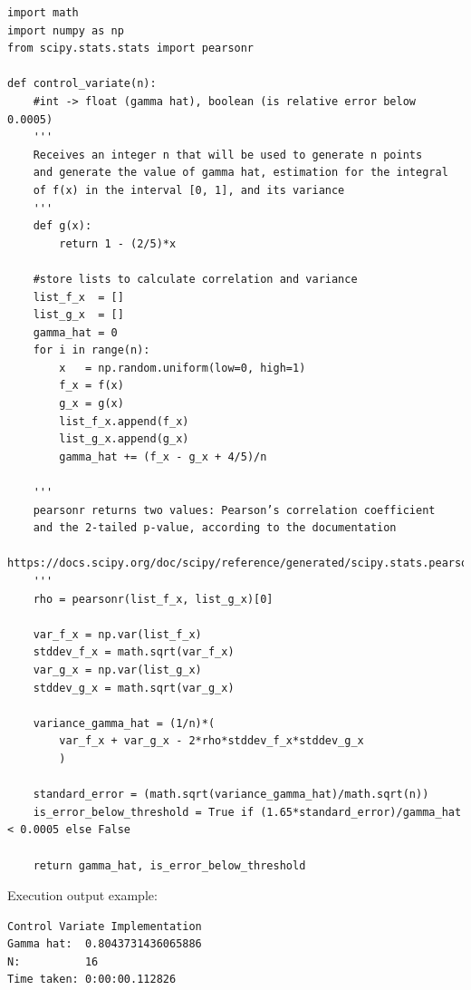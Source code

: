 \documentclass{homework}
\begin{document}
\begin{lstlisting}
import math
import numpy as np
from scipy.stats.stats import pearsonr

def control_variate(n):
	#int -> float (gamma hat), boolean (is relative error below 0.0005)
	'''
	Receives an integer n that will be used to generate n points
	and generate the value of gamma hat, estimation for the integral
	of f(x) in the interval [0, 1], and its variance
	'''
	def g(x):
		return 1 - (2/5)*x

	#store lists to calculate correlation and variance
	list_f_x  = []
	list_g_x  = []
	gamma_hat = 0
	for i in range(n):
		x   = np.random.uniform(low=0, high=1)
		f_x = f(x)
		g_x = g(x)
		list_f_x.append(f_x)
		list_g_x.append(g_x)
		gamma_hat += (f_x - g_x + 4/5)/n

	'''
	pearsonr returns two values: Pearson’s correlation coefficient
	and the 2-tailed p-value, according to the documentation
	https://docs.scipy.org/doc/scipy/reference/generated/scipy.stats.pearsonr.html
	'''
	rho = pearsonr(list_f_x, list_g_x)[0]

	var_f_x = np.var(list_f_x)
	stddev_f_x = math.sqrt(var_f_x)
	var_g_x = np.var(list_g_x)
	stddev_g_x = math.sqrt(var_g_x)

	variance_gamma_hat = (1/n)*(
		var_f_x + var_g_x - 2*rho*stddev_f_x*stddev_g_x
		)

	standard_error = (math.sqrt(variance_gamma_hat)/math.sqrt(n))
	is_error_below_threshold = True if (1.65*standard_error)/gamma_hat < 0.0005 else False

	return gamma_hat, is_error_below_threshold
\end{lstlisting}

Execution output example:
\begin{lstlisting}
Control Variate Implementation
Gamma hat:  0.8043731436065886
N:          16
Time taken: 0:00:00.112826
\end{lstlisting}
\end{document}
